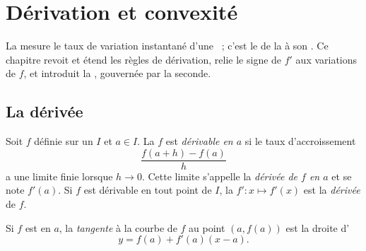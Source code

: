 \chapter{Dérivation et convexité}\label{ch:g12:deriv}

La  mesure le taux de variation instantané d'une ~; c'est le
 de la  à son . Ce chapitre revoit et
étend les règles de dérivation, relie le signe de $f'$ aux variations de $f$,
et introduit la , gouvernée par la  seconde.

\section{La dérivée}

\begin{definition}\label{def:g12:deriv:derivative}
Soit $f$ définie sur un  $I$ et $a \in I$. La  $f$ est
\emph{dérivable en $a$} si le taux d'accroissement
\[
\frac{f(a+h) - f(a)}{h}
\]
a une limite finie lorsque $h \to 0$. Cette limite s'appelle la
\emph{dérivée de $f$ en $a$} et se note $f'(a)$. Si $f$ est dérivable en
tout point de $I$, la  $f' \colon x \mapsto f'(x)$ est la
\emph{dérivée} de $f$.
\end{definition}

\begin{definition}[Tangente]\label{def:g12:deriv:tangent}
Si $f$ est  en $a$, la \emph{tangente} à la courbe
de $f$ au point $(a, f(a))$ est la droite d'
\[
y = f(a) + f'(a)(x - a).
\]
\end{definition}


